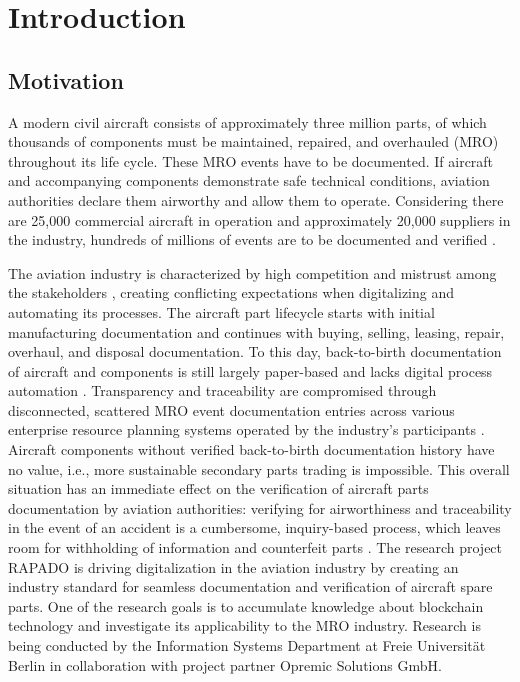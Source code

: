 \chapter{Introduction}
\section{Motivation}
A modern civil aircraft consists of approximately three million parts, of which thousands of components must be maintained, repaired, and overhauled (MRO) throughout its life cycle. These MRO events have to be documented. If aircraft and accompanying components demonstrate safe technical conditions, aviation authorities declare them airworthy and allow them to operate. Considering there are 25,000 commercial aircraft in operation and approximately 20,000 suppliers in the industry, hundreds of millions of events are to be documented and verified \citep{mroBCservices1}.

The aviation industry is characterized by high competition and mistrust among the stakeholders \citep{Chatzi2019TDoC}, creating conflicting expectations when digitalizing and automating its processes. The aircraft part lifecycle starts with initial manufacturing documentation and continues with buying, selling, leasing, repair, overhaul, and disposal documentation. To this day, back-to-birth documentation of aircraft and components is still largely paper-based and lacks digital process automation \citep{efthymiou}. Transparency and traceability are compromised through disconnected, scattered MRO event documentation entries across various enterprise resource planning systems operated by the industry's participants \citep{mroBCservices1}. Aircraft components without verified back-to-birth documentation history have no value, i.e., more sustainable secondary parts trading is impossible. This overall situation has an immediate effect on the verification of aircraft parts documentation by aviation authorities: verifying for airworthiness and traceability in the event of an accident is a cumbersome, inquiry-based process, which leaves room for withholding of information and counterfeit parts \citep{planecrash}. 
The research project RAPADO is driving digitalization in the aviation industry by creating an industry standard for seamless documentation and verification of aircraft spare parts. One of the research goals is to accumulate knowledge about blockchain technology and investigate its applicability to the MRO industry. Research is being conducted by the Information Systems Department at Freie Universit{\"a}t Berlin in collaboration with project partner Opremic Solutions GmbH.

